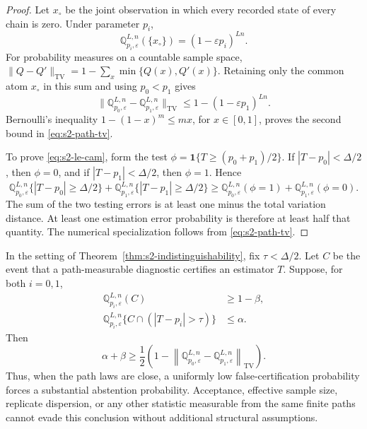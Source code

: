 \begin{proof}
Let \(x_\circ\) be the joint observation in which every recorded state of every
chain is zero.  Under parameter \(p_i\),
\[
 \mathbb Q_{p_i,\varepsilon}^{L,n}(\{x_\circ\})
 =
 (1-\varepsilon p_i)^{Ln}.
\]
For probability measures on a countable sample space,
\(\|Q-Q'\|_{\mathrm{TV}}=1-\sum_x\min\{Q(x),Q'(x)\}\).  Retaining only the
common atom \(x_\circ\) in this sum and using \(p_0<p_1\) gives
\[
 \| \mathbb Q_{p_0,\varepsilon}^{L,n}
      -\mathbb Q_{p_1,\varepsilon}^{L,n}\|_{\mathrm{TV}}
 \leq
 1-(1-\varepsilon p_1)^{Ln}.
\]
Bernoulli's inequality \(1-(1-x)^m\leq mx\), for \(x\in[0,1]\), proves the
second bound in \eqref{eq:s2-path-tv}.

To prove \eqref{eq:s2-le-cam}, form the test
\(\phi=\mathbf 1\{T\geq(p_0+p_1)/2\}\).  If
\(|T-p_0|<\Delta/2\), then \(\phi=0\), and if
\(|T-p_1|<\Delta/2\), then \(\phi=1\).  Hence
\[
 \mathbb Q_{p_0,\varepsilon}^{L,n}
 \{|T-p_0|\geq\Delta/2\}
 +
 \mathbb Q_{p_1,\varepsilon}^{L,n}
 \{|T-p_1|\geq\Delta/2\}
 \geq
 \mathbb Q_{p_0,\varepsilon}^{L,n}(\phi=1)
 +
 \mathbb Q_{p_1,\varepsilon}^{L,n}(\phi=0).
\]
The sum of the two testing errors is at least one minus the total variation
distance.  At least one estimation error probability is therefore at least
half that quantity.  The numerical specialization follows from
\eqref{eq:s2-path-tv}.
\end{proof}

\begin{corollary}
\label{cor:s2-no-certificate}
In the setting of Theorem~\ref{thm:s2-indistinguishability}, fix
\(\tau<\Delta/2\).  Let \(C\) be the event that a path-measurable diagnostic
certifies an estimator \(T\).  Suppose, for both \(i=0,1\),
\begin{align}
 \mathbb Q_{p_i,\varepsilon}^{L,n}(C)
 &\geq 1-\beta,
 \label{eq:s2-cert-power}\\
 \mathbb Q_{p_i,\varepsilon}^{L,n}
 \{C\cap(|T-p_i|>\tau)\}
 &\leq\alpha.
 \label{eq:s2-cert-error}
\end{align}
Then
\begin{equation}
 \alpha+\beta
 \geq
 \frac12
 \left(
  1-
  \left\|
   \mathbb Q_{p_0,\varepsilon}^{L,n}
   -
   \mathbb Q_{p_1,\varepsilon}^{L,n}
  \right\|_{\mathrm{TV}}
 \right).
 \label{eq:s2-cert-impossibility}
\end{equation}
Thus, when the path laws are close, a uniformly low false-certification
probability forces a substantial abstention probability.  Acceptance,
effective sample size, replicate dispersion, or any other statistic measurable
from the same finite paths cannot evade this conclusion without additional
structural assumptions.
\end{corollary}

